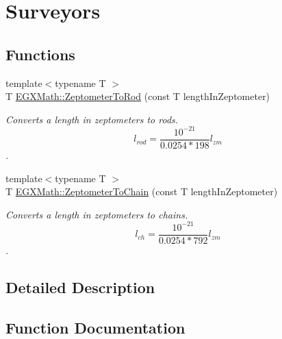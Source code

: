 \hypertarget{group___e_g_x_math-_conversions-_length_conversions-_zeptometer-_surveyors}{}\section{Surveyors}
\label{group___e_g_x_math-_conversions-_length_conversions-_zeptometer-_surveyors}
\subsection*{Functions}
\begin{DoxyCompactItemize}
\item 
{\footnotesize template$<$typename T $>$ }\\T \mbox{\hyperlink{group___e_g_x_math-_conversions-_length_conversions-_zeptometer-_surveyors_gac0c6193e55739ec7f4c3769ebddb65e2}{E\+G\+X\+Math\+::\+Zeptometer\+To\+Rod}} (const T length\+In\+Zeptometer)
\begin{DoxyCompactList}\small\item\em Converts a length in zeptometers to rods. \[ l_{rod}= \frac{10^{-21}}{0.0254 * 198} l_{zm} \]. \end{DoxyCompactList}\item 
{\footnotesize template$<$typename T $>$ }\\T \mbox{\hyperlink{group___e_g_x_math-_conversions-_length_conversions-_zeptometer-_surveyors_gaf9fce38080eb9c090004c9df2a5dead1}{E\+G\+X\+Math\+::\+Zeptometer\+To\+Chain}} (const T length\+In\+Zeptometer)
\begin{DoxyCompactList}\small\item\em Converts a length in zeptometers to chains. \[ l_{ch}= \frac{10^{-21}}{0.0254 * 792} l_{zm} \]. \end{DoxyCompactList}\end{DoxyCompactItemize}


\subsection{Detailed Description}


\subsection{Function Documentation}
\mbox{\label{group___e_g_x_math-_conversions-_length_conversions-_zeptometer-_surveyors_gaf9fce38080eb9c090004c9df2a5dead1}} 
